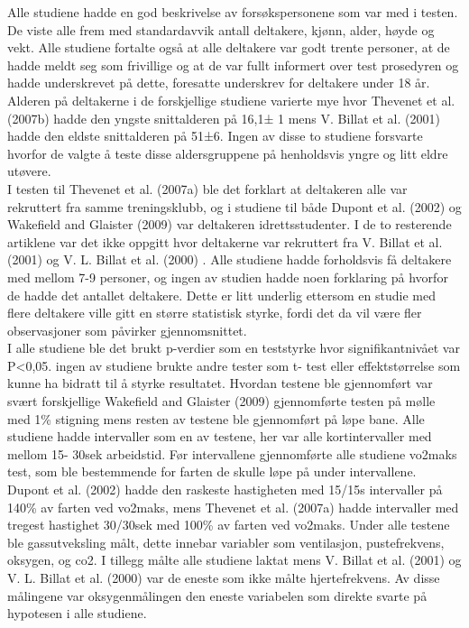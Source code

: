 \documentclass[
]{article}
\begin{document}
Alle studiene hadde en god beskrivelse av forsøkspersonene som var med i
testen. De viste alle frem med standardavvik antall deltakere, kjønn,
alder, høyde og vekt. Alle studiene fortalte også at alle deltakere var
godt trente personer, at de hadde meldt seg som frivillige og at de var
fullt informert over test prosedyren og hadde underskrevet på dette,
foresatte underskrev for deltakere under 18 år. Alderen på deltakerne i
de forskjellige studiene varierte mye hvor Thevenet et al. (2007b) hadde
den yngste snittalderen på 16,1± 1 mens V. Billat et al. (2001) hadde
den eldste snittalderen på 51±6. Ingen av disse to studiene forsvarte
hvorfor de valgte å teste disse aldersgruppene på henholdsvis yngre og
litt eldre utøvere.\\
I testen til Thevenet et al. (2007a) ble det forklart at deltakeren alle
var rekruttert fra samme treningsklubb, og i studiene til både Dupont et
al. (2002) og Wakefield and Glaister (2009) var deltakeren
idrettsstudenter. I de to resterende artiklene var det ikke oppgitt hvor
deltakerne var rekruttert fra V. Billat et al. (2001) og V. L. Billat et
al. (2000) . Alle studiene hadde forholdsvis få deltakere med mellom 7-9
personer, og ingen av studien hadde noen forklaring på hvorfor de hadde
det antallet deltakere. Dette er litt underlig ettersom en studie med
flere deltakere ville gitt en større statistisk styrke, fordi det da vil
være fler observasjoner som påvirker gjennomsnittet.\\
I alle studiene ble det brukt p-verdier som en teststyrke hvor
signifikantnivået var P\textless0,05. ingen av studiene brukte andre
tester som t- test eller effektstørrelse som kunne ha bidratt til å
styrke resultatet. Hvordan testene ble gjennomført var svært
forskjellige Wakefield and Glaister (2009) gjennomførte testen på mølle
med 1\% stigning mens resten av testene ble gjennomført på løpe bane.
Alle studiene hadde intervaller som en av testene, her var alle
kortintervaller med mellom 15- 30sek arbeidstid. Før intervallene
gjennomførte alle studiene vo2maks test, som ble bestemmende for farten
de skulle løpe på under intervallene. Dupont et al. (2002) hadde den
raskeste hastigheten med 15/15s intervaller på 140\% av farten ved
vo2maks, mens Thevenet et al. (2007a) hadde intervaller med tregest
hastighet 30/30sek med 100\% av farten ved vo2maks. Under alle testene
ble gassutveksling målt, dette innebar variabler som ventilasjon,
pustefrekvens, oksygen, og co2. I tillegg målte alle studiene laktat
mens V. Billat et al. (2001) og V. L. Billat et al. (2000) var de eneste
som ikke målte hjertefrekvens. Av disse målingene var oksygenmålingen
den eneste variabelen som direkte svarte på hypotesen i alle studiene.
\end{document}

